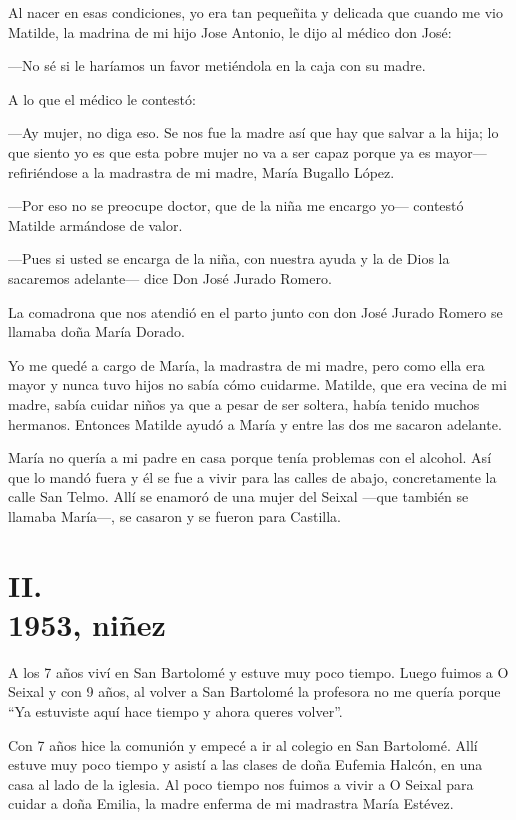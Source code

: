 \documentclass[12pt,a5paper]{book}
\begin{document}
Al nacer en esas condiciones, yo era tan pequeñita y delicada que cuando me vio Matilde, la madrina de mi hijo Jose Antonio, le dijo al médico don José:

---No sé si le haríamos un favor metiéndola en la caja con su madre.

A lo que el médico le contestó:

---Ay mujer, no diga eso. Se nos fue la madre así que hay que salvar a la hija; lo que siento yo es que esta pobre mujer no va a ser capaz porque ya es mayor--- refiriéndose a la madrastra de mi madre, María Bugallo López.

---Por eso no se preocupe doctor, que de la niña me encargo yo--- contestó Matilde armándose de valor.

---Pues si usted se encarga de la niña, con nuestra ayuda y la de Dios la sacaremos adelante--- dice Don José Jurado Romero.

La comadrona que nos atendió en el parto junto con don José Jurado Romero se llamaba doña María Dorado.

Yo me quedé a cargo de María, la madrastra de mi madre, pero como ella era mayor y nunca tuvo hijos no sabía cómo cuidarme. Matilde, que era vecina de mi madre, sabía cuidar niños ya que a pesar de ser soltera, había tenido muchos hermanos. Entonces Matilde ayudó a María y entre las dos me sacaron adelante.

María no quería a mi padre en casa porque tenía problemas con el alcohol. Así que lo mandó fuera y él se fue a vivir para las calles de abajo, concretamente la calle San Telmo. Allí se enamoró de una mujer del Seixal ---que también se llamaba María---, se casaron y se fueron para Castilla.

\section*{II.\\1953, niñez}

A los 7 años viví en San Bartolomé y estuve muy poco tiempo. Luego fuimos a O Seixal y con 9 años, al volver a San Bartolomé la profesora no me quería porque “Ya estuviste aquí hace tiempo y ahora queres volver”.

Con 7 años hice la comunión y empecé a ir al colegio en San Bartolomé. Allí estuve muy poco tiempo y asistí a las clases de doña Eufemia Halcón, en una casa al lado de la iglesia. Al poco tiempo nos fuimos a vivir a O Seixal para cuidar a doña Emilia, la madre enferma de mi madrastra María Estévez.
\end{document}
